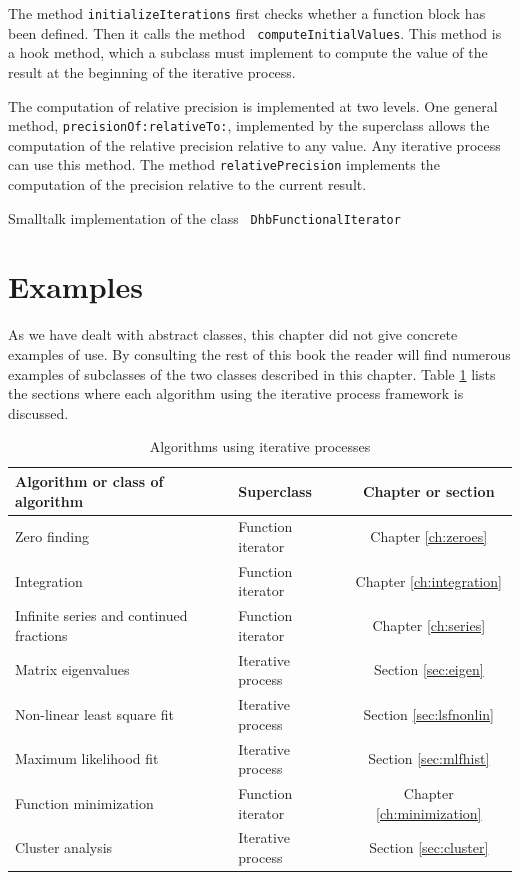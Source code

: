 \documentclass[twoside]{book}
\begin{document}
The method {\tt initializeIterations} first checks whether a
function block has been defined. Then it calls the method {\tt
computeInitialValues}. This method is a hook method, which a
subclass must implement to compute the value of the result at the
beginning of the iterative process.

The computation of relative precision is implemented at two
levels. One general method, {\tt precisionOf:relativeTo:},
implemented by the superclass allows the computation of the
relative precision relative to any value. Any iterative process
can use this method. The method {\tt relativePrecision} implements
the computation of the precision relative to the current result.

\begin{listing} Smalltalk implementation of the class {\tt
DhbFunctionalIterator}
\label{ls:iterrel}

\end{listing}


\section{Examples}
As we have dealt with abstract classes, this chapter did not give
concrete examples of use. By consulting the rest of this book the
reader will find numerous examples of subclasses of the two
classes described in this chapter. Table \ref{tb:iteration} lists
the sections where each algorithm using the iterative process
framework is discussed.
\begin{table}[h]
  \centering
  \caption{Algorithms using iterative processes}\label{tb:iteration}
\vspace{1 ex}
\begin{tabular}{|l|l|c|} \hline
{\bf Algorithm or class of algorithm}&{\bf Superclass}&{\bf
Chapter or section}
\\ \hline Zero finding&Function iterator&Chapter \ref{ch:zeroes}
\\ \hline Integration&Function iterator&Chapter
\ref{ch:integration}
\\ \hline Infinite series and continued fractions&Function
iterator&Chapter \ref{ch:series}  \\ \hline Matrix
eigenvalues&Iterative process&Section \ref{sec:eigen}
\\ \hline Non-linear least square fit&Iterative process&Section
\ref{sec:lsfnonlin}
\\ \hline Maximum likelihood fit&Iterative process&Section \ref{sec:mlfhist} \\
\hline Function minimization&Function iterator&Chapter
\ref{ch:minimization}  \\ \hline Cluster analysis&Iterative
process&Section \ref{sec:cluster} \\ \hline
\end{tabular}

\end{table}


\ifx\wholebook\relax\else
\end{document}
